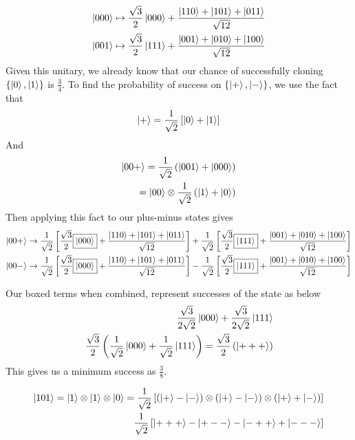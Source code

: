 \documentclass[]{article}
\begin{document}
\[
\begin{align*}  
\ket{000} & \mapsto \frac{\sqrt{3}}{2} \ket{000} + \frac{\ket{110} + \ket{101} + \ket{011}}{\sqrt{12}} \\  
\ket{001} & \mapsto \frac{\sqrt{3}}{2} \ket{111} + \frac{\ket{001} + \ket{010} + \ket{100}}{\sqrt{12}} \\  
\end{align*}
\] Given this unitary, we already know that our chance of successfully
cloning \(\left\{ \ket{0},\ket{1} \right\}\) is \(\frac{3}{4}\). To find
the probability of success on \(\left\{\ket{+},\ket{-} \right\}\), we
use the fact that \[
\ket{+}  = \frac{1}{\sqrt{ 2 }}\left[ \ket{0} +\ket{1}  \right] 
\] And \[
\begin{align}
\ket{00+}  = \frac{1}{\sqrt{ 2 }}\left( \ket{001} +\ket{000}  \right)  \\
=\ket{00} \otimes \frac{1}{\sqrt{ 2 }}\left( \ket{1} +\ket{0}  \right) 
\end{align}
\] Then applying this fact to our plus-minus states gives \[
\begin{align}
\ket{00+}  \to  \frac{1}{\sqrt{ 2 }}\left[ \frac{\sqrt{3}}{2} \boxed{\ket{000} } + \frac{\ket{110} + \ket{101} + \ket{011}}{\sqrt{12}} \right] +\frac{1}{\sqrt{ 2 }}\left[ \frac{\sqrt{3}}{2} \boxed{\ket{111} } + \frac{\ket{001} + \ket{010} + \ket{100}}{\sqrt{12}} \right]  \\
\ket{00-}  \to  \frac{1}{\sqrt{ 2 }}\left[ \frac{\sqrt{3}}{2} \boxed{\ket{000} } + \frac{\ket{110} + \ket{101} + \ket{011}}{\sqrt{12}} \right] -\frac{1}{\sqrt{ 2 }}\left[ \frac{\sqrt{3}}{2} \boxed{\ket{111} } + \frac{\ket{001} + \ket{010} + \ket{100}}{\sqrt{12}} \right] 
\end{align}
\]

Our boxed terms when combined, represent successes of the state as below
\[
\begin{align}
\frac{\sqrt{ 3 }}{2\sqrt{ 2 }}\ket{000}+\frac{\sqrt{ 3 }}{2\sqrt{ 2 }}\ket{111}  \\
\frac{\sqrt{ 3 }}{2}\left( \frac{1}{\sqrt{ 2 }}\ket{000} +\frac{1}{\sqrt{ 2 } }\ket{111} \right)  = \frac{\sqrt{ 3 }}{2}\left( \ket{+++}  \right) 
\end{align}
\] This gives us a minimum success as \(\frac{3}{8}\).

\[
\begin{align}
\ket{101}  = \ket{1} \otimes \ket{1} \otimes \ket{0}  = \frac{1}{\sqrt{ 2 }}\left[ \left( \ket{+} -\ket{-}  \right)\otimes\left( \ket{+} -\ket{-}  \right)\otimes \left( \ket{+} +\ket{-}  \right)  \right]  \\
\frac{1}{\sqrt{ 2 }}\left[ \ket{+++} -\ket{+--}-\ket{-++}+\ket{---}    \right] 
\end{align}
\]
\end{document}
